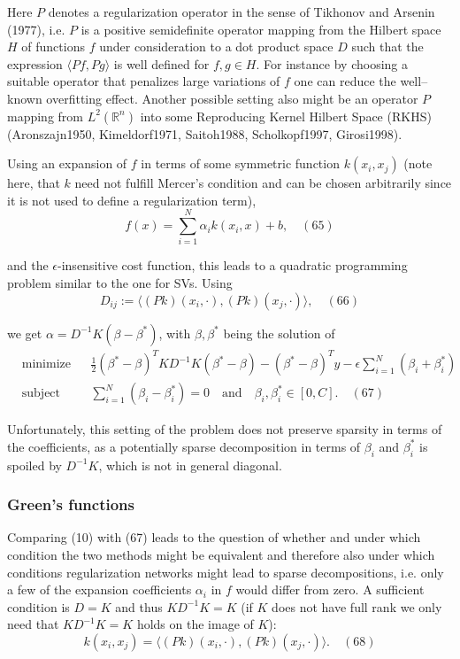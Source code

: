 \documentclass[fleqn,10pt]{olplainarticle}
\begin{document}
Here \(P\) denotes a regularization operator in the sense of Tikhonov and Arsenin (1977), i.e. \(P\) is a positive semidefinite operator mapping from the Hilbert space \(H\) of functions \(f\) under consideration to a dot product space \(D\) such that the expression \(\langle Pf, Pg \rangle\) is well defined for \(f, g \in H\). For instance by choosing a suitable operator that penalizes large variations of \(f\) one can reduce the well–known overfitting effect. Another possible setting also might be an operator \(P\) mapping from \(L^2(\mathbb{R}^n)\) into some Reproducing Kernel Hilbert Space (RKHS) (Aronszajn1950, Kimeldorf1971, Saitoh1988, Scholkopf1997, Girosi1998).

Using an expansion of \(f\) in terms of some symmetric function \(k(x_i, x_j)\) (note here, that \(k\) need not fulfill Mercer’s condition and can be chosen arbitrarily since it is not used to define a regularization term),
\[
f(x) = \sum_{i=1}^N \alpha_i k(x_i, x) + b, \quad (65)
\]

and the \(\epsilon\)-insensitive cost function, this leads to a quadratic programming problem similar to the one for SVs. Using
\[
D_{ij} := \langle (Pk)(x_i, \cdot), (Pk)(x_j, \cdot) \rangle, \quad (66)
\]

we get \(\alpha = D^{-1}K(\beta - \beta^*)\), with \(\beta, \beta^*\) being the solution of
\[
\begin{aligned}
&\text{minimize} && \frac{1}{2} (\beta^* - \beta)^T K D^{-1} K (\beta^* - \beta) - (\beta^* - \beta)^T y - \epsilon \sum_{i=1}^N (\beta_i + \beta^*_i) \\
&\text{subject to} && \sum_{i=1}^N (\beta_i - \beta^*_i) = 0 \quad \text{and} \quad \beta_i, \beta^*_i \in [0,C]. \quad (67)
\end{aligned}
\]

Unfortunately, this setting of the problem does not preserve sparsity in terms of the coefficients, as a potentially sparse decomposition in terms of \(\beta_i\) and \(\beta^*_i\) is spoiled by \(D^{-1}K\), which is not in general diagonal.

\subsubsection{Green’s functions}

Comparing (10) with (67) leads to the question of whether and under which condition the two methods might be equivalent and therefore also under which conditions regularization networks might lead to sparse decompositions, i.e. only a few of the expansion coefficients \(\alpha_i\) in \(f\) would differ from zero. A sufficient condition is \(D = K\) and thus \(KD^{-1}K = K\) (if \(K\) does not have full rank we only need that \(KD^{-1}K = K\) holds on the image of \(K\)):
\[
k(x_i, x_j) = \langle (Pk)(x_i, \cdot), (Pk)(x_j, \cdot) \rangle. \quad (68)
\]
\end{document}
